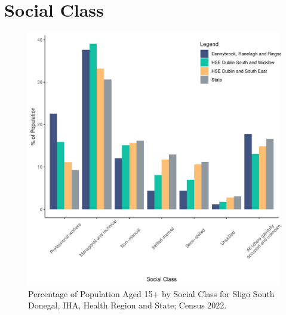 \documentclass{article}
\begin{document}
\section{Social Class}\label{sect:SC}
\begin{figure}[H]
	\centering
	\includegraphics[width = 140mm]{../figures/SocialClassED.pdf}
	\caption{Percentage of Population Aged 15+ by Social Class for Sligo South Donegal, IHA, Health Region and State; Census 2022.}
	\label{fig:vbnv}
	\end{figure}
\end{document}

